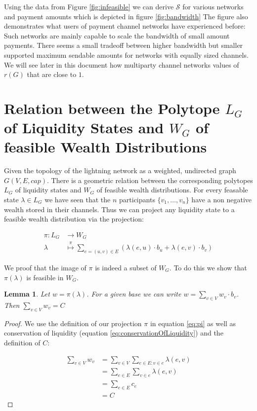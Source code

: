 \documentclass[10pt,twocolumn]{article}
\newtheorem{lemma}[theorem]{Lemma}
\begin{document}
Using the data from Figure \ref{fig:infeasible} we can derive $\mathcal{S}$ for various networks and payment amounts which is depicted in figure \ref{fig:bandwidth}
The figure also demonstrates what users of payment channel networks have experienced before:
Such networks are mainly capable to scale the bandwidth of small amount payments.
There seems a small tradeoff between higher bandwidth but smaller supported maximum sendable amounts for networks with equally sized channels.
We will see later in this document how multiparty channel networks values of \( r(G) \) that are close to $1$.

\section{Relation between the Polytope $L_G$ of Liquidity States and $W_G$ of feasible Wealth Distributions}
Given the topology of the lightning network as a weighted, undirected graph $G(V,E,cap)$.
There is a geometric relation between the corresponding polytopes $L_G$ of liquidity states and $W_G$ of feasible wealth distributions.
For every feasable state $\lambda \in L_G$ we have seen that the $n$ participants $\{v_1,\dots,v_n\}$ have a non negative wealth stored in their channels.
Thus we can project any liquidity state to a feasible wealth distribution via the projection:

\begin{equation}
  \begin{split}
  \label{eq:pi}
  \pi: L_G & \longrightarrow {W_G}\\
  \lambda & \stackrel{\pi}{\longmapsto}\sum_{e=(u,v)\in E}\left(\lambda(e,u)\cdot b_u + \lambda(e,v)\cdot b_v\right)
  \end{split}
\end{equation}

We proof that the image of $\pi$ is indeed a subset of $W_G$. To do this we show that $\pi(\lambda)$ is feasible in $W_G$.

\begin{lemma}
Let $w = \pi(\lambda)$. For a given base we can write $w=\sum_{v\in V}w_v\cdot b_v$. Then $\sum_{v\in V}w_v = C$ 
\end{lemma}
\begin{proof}
  We use the definition of our projection $\pi$ in equation \ref{eq:pi} as well as conservation of liquidity (equation \ref{eq:conservationOfLiquidity}) and the definition of $C$:

\begin{equation}
\begin{split}
  \sum_{v\in V}w_v & = \sum_{v\in V}\sum_{e\in E:v \in e}\lambda(e,v) \\
  & = \sum_{e\in E}\sum_{v\in e}\lambda(e,v) \\
  & = \sum_{e\in E} c_{e} \\
  & = C
\end{split}
\end{equation}
\end{proof}
\end{document}
